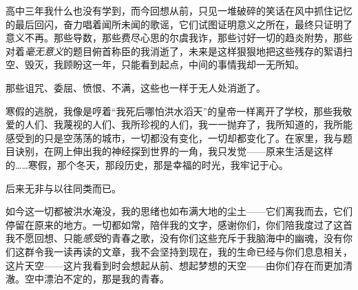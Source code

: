 \documentclass{ctexbook}
\begin{document}
    高中三年我什么也没有学到，而今回想从前，只见一堆破碎的笑话在风中抓住记忆的最后回闪，奋力唱着闻所未闻的歌谣，它们试图证明意义之所在，最终只证明了意义不再。那些导数，那些费尽心思的尔虞我诈，那些讨好一切的趋炎附势，那些对着\emph{毫无意义}的题目俯首称臣的我消逝了，未来是这样狠狠地把这些残存的絮语扫空、毁灭，我顾盼这一年，只能看到起点，中间的事情我却一无所知。

    那些诅咒、委屈、愤恨、不满，这些也一样于无人处消逝了。

    寒假的逃脱，我像是哼着“我死后哪怕洪水滔天”的皇帝一样离开了学校，那些我敬爱的人们、我蔑视的人们、我所珍视的人们，我一一抛弃了，我所知道的，我所能感受到的只是空荡荡的城市，一切都没有变化，一切却都变化了。在家里，我与题目诀别，在网上伸出我的神经探到世界的一角，我只发觉——原来生活是这样的……寒假，那个冬天，那段历史，那是幸福的时光，我牢记于心。

    后来无非与以往同类而已。

    如今这一切都被洪水淹没，我的思绪也如布满大地的尘土——它们离我而去，它们停留在原来的地方。一切都如常，陪伴我的文字，感谢你们，你们陪我度过了这首我不愿回想、只能\emph{感受}的青春之歌，没有你们这些充斥于我脑海中的幽魂，没有你们这群令我一读再读的文章，我不会坚持到现在，我的生命已经与你们息息相关，这片天空——这片我看到时会想起从前、想起梦想的天空——由你们存在而更加清澈。空中漂泊不定的，那是我的青春。
\end{document}
